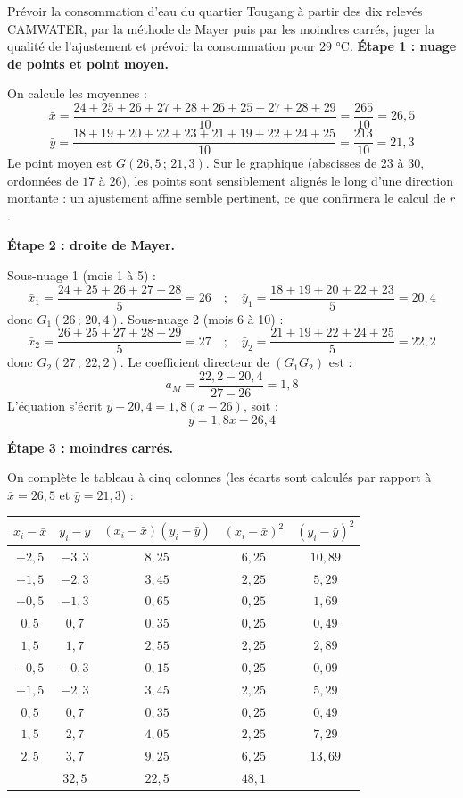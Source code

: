 \documentclass[11pt]{article}
\begin{document}
\begin{exoresolu}
Prévoir la consommation d'eau du quartier Tougang à partir des dix relevés CAMWATER, par la méthode de Mayer puis par les moindres carrés, juger la qualité de l'ajustement et prévoir la consommation pour $29$ °C.
\tcblower
\textbf{Étape 1 : nuage de points et point moyen.}

On calcule les moyennes :
\[
\bar{x}=\frac{24+25+26+27+28+26+25+27+28+29}{10}=\frac{265}{10}=26{,}5
\]
\[
\bar{y}=\frac{18+19+20+22+23+21+19+22+24+25}{10}=\frac{213}{10}=21{,}3
\]
Le point moyen est $G(26{,}5\,;\,21{,}3)$. Sur le graphique (abscisses de $23$ à $30$, ordonnées de $17$ à $26$), les points sont sensiblement alignés le long d'une direction montante : un ajustement affine semble pertinent, ce que confirmera le calcul de $r$.

\textbf{Étape 2 : droite de Mayer.}

Sous-nuage 1 (mois 1 à 5) :
\[
\bar{x}_1=\frac{24+25+26+27+28}{5}=26 \quad ; \quad \bar{y}_1=\frac{18+19+20+22+23}{5}=20{,}4
\]
donc $G_1(26\,;\,20{,}4)$. Sous-nuage 2 (mois 6 à 10) :
\[
\bar{x}_2=\frac{26+25+27+28+29}{5}=27 \quad ; \quad \bar{y}_2=\frac{21+19+22+24+25}{5}=22{,}2
\]
donc $G_2(27\,;\,22{,}2)$. Le coefficient directeur de $(G_1G_2)$ est :
\[
a_M=\frac{22{,}2-20{,}4}{27-26}=1{,}8
\]
L'équation s'écrit $y-20{,}4=1{,}8(x-26)$, soit :
\[
\boxed{y=1{,}8x-26{,}4}
\]

\textbf{Étape 3 : moindres carrés.}

On complète le tableau à cinq colonnes (les écarts sont calculés par rapport à $\bar{x}=26{,}5$ et $\bar{y}=21{,}3$) :

\begin{center}
\begin{tabular}{|c|c|c|c|c|}
\hline
\rowcolor{popblueL}
$x_i-\bar{x}$ & $y_i-\bar{y}$ & $(x_i-\bar{x})(y_i-\bar{y})$ & $(x_i-\bar{x})^2$ & $(y_i-\bar{y})^2$ \\
\hline
$-2{,}5$ & $-3{,}3$ & $8{,}25$ & $6{,}25$ & $10{,}89$ \\
$-1{,}5$ & $-2{,}3$ & $3{,}45$ & $2{,}25$ & $5{,}29$ \\
$-0{,}5$ & $-1{,}3$ & $0{,}65$ & $0{,}25$ & $1{,}69$ \\
$0{,}5$ & $0{,}7$ & $0{,}35$ & $0{,}25$ & $0{,}49$ \\
$1{,}5$ & $1{,}7$ & $2{,}55$ & $2{,}25$ & $2{,}89$ \\
$-0{,}5$ & $-0{,}3$ & $0{,}15$ & $0{,}25$ & $0{,}09$ \\
$-1{,}5$ & $-2{,}3$ & $3{,}45$ & $2{,}25$ & $5{,}29$ \\
$0{,}5$ & $0{,}7$ & $0{,}35$ & $0{,}25$ & $0{,}49$ \\
$1{,}5$ & $2{,}7$ & $4{,}05$ & $2{,}25$ & $7{,}29$ \\
$2{,}5$ & $3{,}7$ & $9{,}25$ & $6{,}25$ & $13{,}69$ \\
\hline
\rowcolor{popgreenL}
\multicolumn{2}{|c|}{Sommes} & $32{,}5$ & $22{,}5$ & $48{,}1$ \\
\hline
\end{tabular}
\end{center}


\end{exoresolu}
\end{document}
